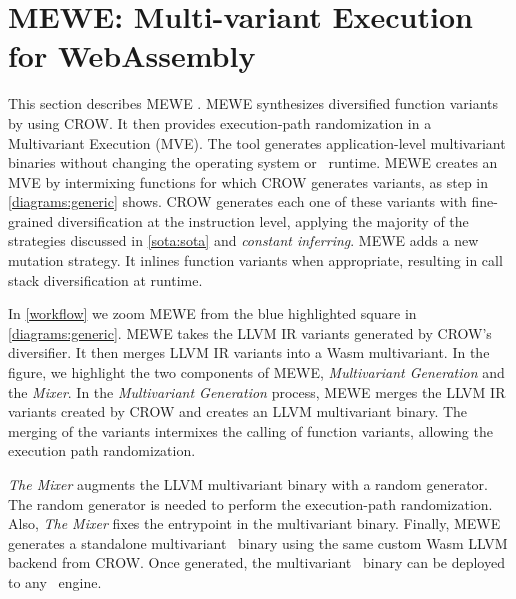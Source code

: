 \section{MEWE: Multi-variant Execution for WebAssembly}
\label{section:mewe}

\renewcommand{\tool}{MEWE\xspace}
\newcommand{\repourl}{TODO}
This section describes MEWE \cite{MEWE}. 
\tool synthesizes diversified function variants by using CROW.
It then provides execution-path randomization in a Multivariant Execution (MVE).
The tool generates application-level multivariant binaries without changing the operating system or \wasm\ runtime.
MEWE creates an MVE by intermixing functions for which CROW generates variants, as step  in \autoref{diagrams:generic} shows.
CROW generates each one of these variants with fine-grained diversification at the instruction level, applying the majority of the strategies discussed in \autoref{sota:sota} and \emph{constant inferring}. \tool adds a new mutation strategy. It inlines function variants when appropriate, resulting in call stack diversification at runtime.

In \autoref{workflow} we zoom MEWE from the blue highlighted square in \autoref{diagrams:generic}. MEWE takes the LLVM IR variants generated by CROW's diversifier. It then merges LLVM IR variants into a Wasm multivariant.
In the figure, we highlight the two components of MEWE, \emph{Multivariant Generation} and the \emph{Mixer}.
In the \emph{Multivariant Generation} process, 
MEWE merges the LLVM IR variants created by CROW and creates an LLVM multivariant binary.
The merging of the variants intermixes the calling of function variants, allowing the execution path randomization.

\emph{The Mixer} augments the LLVM multivariant binary with a random generator. The random generator is needed to perform the execution-path randomization.
Also, \emph{The Mixer} fixes the entrypoint in the multivariant binary.
Finally, MEWE generates a standalone multivariant \wasm\ binary using the same custom Wasm LLVM backend from CROW.
Once generated, the multivariant \wasm\ binary can be deployed to any \wasm\ engine. 

